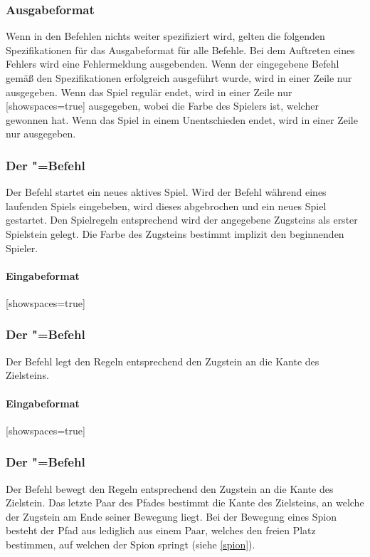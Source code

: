 \documentclass[ngerman, gray]{sdqassignment}
\begin{document}
\subsubsection{Ausgabeformat}
Wenn in den Befehlen nichts weiter spezifiziert wird, gelten die folgenden Spezifikationen für das Ausgabeformat für alle Befehle. Bei dem Auftreten eines Fehlers wird eine Fehlermeldung ausgebenden. Wenn der eingegebene Befehl gemäß den Spezifikationen erfolgreich ausgeführt wurde, wird in einer Zeile nur  ausgegeben. Wenn das Spiel regulär endet, wird in einer Zeile nur [showspaces=true] ausgegeben, wobei  die Farbe des Spielers ist, welcher gewonnen hat. Wenn das Spiel in einem Unentschieden endet, wird in einer Zeile nur  ausgegeben.

\subsubsection{Der "=Befehl}
Der Befehl startet ein neues aktives Spiel. Wird der Befehl während eines laufenden Spiels eingebeben, wird dieses abgebrochen und ein neues Spiel gestartet. Den Spielregeln entsprechend wird der angegebene Zugsteins als erster Spielstein gelegt. Die Farbe des Zugsteins bestimmt implizit den beginnenden Spieler.
\paragraph{Eingabeformat}[showspaces=true]

\subsubsection{Der "=Befehl}
Der Befehl legt den Regeln entsprechend den Zugstein an die Kante des Zielsteins.
\paragraph{Eingabeformat}[showspaces=true]

\subsubsection{Der "=Befehl}
Der Befehl bewegt den Regeln entsprechend den Zugstein an die Kante des Zielstein. Das letzte Paar des Pfades bestimmt die Kante des Zielsteins, an welche der Zugstein am Ende seiner Bewegung liegt. Bei der Bewegung eines Spion besteht der Pfad aus lediglich aus einem Paar, welches den freien Platz bestimmen, auf welchen der Spion springt (siehe \cref{spion}).
\end{document}
